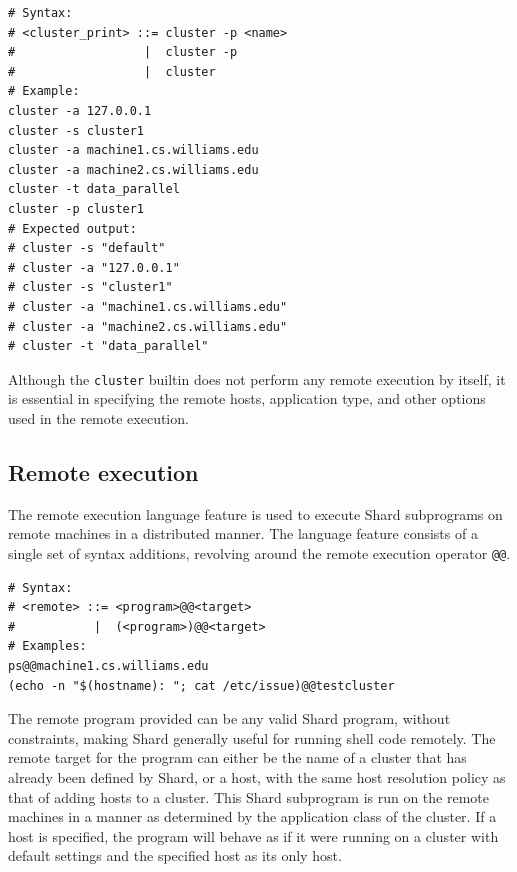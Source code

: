 \documentclass[twoside]{report}
\begin{document}
\begin{minipage}[c]{\textwidth-15pt}
  \begin{lstlisting}[language=Shard]
# Syntax:
# <cluster_print> ::= cluster -p <name>
#                  |  cluster -p
#                  |  cluster
# Example:
cluster -a 127.0.0.1
cluster -s cluster1
cluster -a machine1.cs.williams.edu
cluster -a machine2.cs.williams.edu
cluster -t data_parallel
cluster -p cluster1
# Expected output:
# cluster -s "default"
# cluster -a "127.0.0.1"
# cluster -s "cluster1"
# cluster -a "machine1.cs.williams.edu"
# cluster -a "machine2.cs.williams.edu"
# cluster -t "data_parallel"
\end{lstlisting}
  \smallskip
\end{minipage}

Although the \texttt{cluster} builtin does not perform any remote execution by itself, it is essential in specifying the remote hosts, application type, and other options used in the remote execution.

\subsection{Remote execution}
The remote execution language feature is used to execute Shard subprograms on remote machines in a distributed manner.
The language feature consists of a single set of syntax additions, revolving around the remote execution operator \texttt{@@}.

\begin{minipage}[c]{\textwidth-15pt}
  \begin{lstlisting}[language=Shard]
# Syntax:
# <remote> ::= <program>@@<target>
#           |  (<program>)@@<target>
# Examples:
ps@@machine1.cs.williams.edu
(echo -n "$(hostname): "; cat /etc/issue)@@testcluster
\end{lstlisting}
  \smallskip
\end{minipage}

The remote program provided can be any valid Shard program, without constraints, making Shard generally useful for running shell code remotely.
The remote target for the program can either be the name of a cluster that has already been defined by Shard, or a host, with the same host resolution policy as that of adding hosts to a cluster.
This Shard subprogram is run on the remote machines in a manner as determined by the application class of the cluster.
If a host is specified, the program will behave as if it were running on a cluster with default settings and the specified host as its only host.
\end{document}
